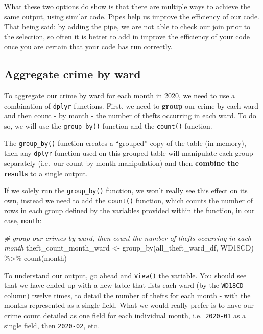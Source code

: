 \documentclass[
]{book}
\newenvironment{Shaded}{\begin{snugshade}}{\end{snugshade}}
\newcommand{\CommentTok}[1]{\textcolor[rgb]{0.56,0.35,0.01}{\textit{#1}}}
\newcommand{\FunctionTok}[1]{\textcolor[rgb]{0.00,0.00,0.00}{#1}}
\newcommand{\NormalTok}[1]{#1}
\newcommand{\OtherTok}[1]{\textcolor[rgb]{0.56,0.35,0.01}{#1}}
\newcommand{\SpecialCharTok}[1]{\textcolor[rgb]{0.00,0.00,0.00}{#1}}
\begin{document}
What these two options do show is that there are multiple ways to achieve the same output, using similar code. Pipes help us improve the efficiency of our code. That being said: by adding the pipe, we are not able to check our join prior to the selection, so often it is better to add in improve the efficiency of your code once you are certain that your code has run correctly.

\hypertarget{aggregate-crime-by-ward}{%
\subsection{Aggregate crime by ward}\label{aggregate-crime-by-ward}}

To aggregate our crime by ward for each month in 2020, we need to use a combination of \texttt{dplyr} functions. First, we need to \textbf{group} our crime by each ward and then count - by month - the number of thefts occurring in each ward. To do so, we will use the \texttt{group\_by()} function and the \texttt{count()} function.

The \texttt{group\_by()} function creates a ``grouped'' copy of the table (in memory), then any \texttt{dplyr} function used on this grouped table will manipulate each group separately (i.e.~our count by month manipulation) and then \textbf{combine the results} to a single output.

If we solely run the \texttt{group\_by()} function, we won't really see this effect on its own, instead we need to add the \texttt{count()} function, which counts the number of rows in each group defined by the variables provided within the function, in our case, \texttt{month}:

\begin{Shaded}
\begin{Highlighting}[]
\CommentTok{\# group our crimes by ward, then count the number of thefts occurring in each month}
\NormalTok{theft\_count\_month\_ward }\OtherTok{\textless{}{-}} \FunctionTok{group\_by}\NormalTok{(all\_theft\_ward\_df, WD18CD) }\SpecialCharTok{\%\textgreater{}\%} \FunctionTok{count}\NormalTok{(month)}
\end{Highlighting}
\end{Shaded}

To understand our output, go ahead and \texttt{View()} the variable. You should see that we have ended up with a new table that lists each ward (by the \texttt{WD18CD} column) twelve times, to detail the number of thefts for each month - with the months represented as a single field. What we would really prefer is to have our crime count detailed as one field for each individual month, i.e.~\texttt{2020-01} as a single field, then \texttt{2020-02}, etc.
\end{document}
